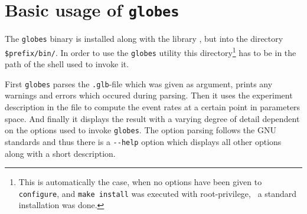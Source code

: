 \section{Basic usage of {\tt globes}}
\label{sec:globes_basics}

The {\tt globes} binary is installed along 
with the library , but
into the directory {\tt \$prefix/bin/}. In order to use the {\tt globes} 
utility this directory\footnote{This is automatically the case, when
no options have been given to {\tt configure}, and {\tt make install} was 
executed with root-privilege, \ie\ a standard installation was done.} has to 
be in the path of the shell used to invoke it.

First {\tt globes} parses the {\tt .glb}-file which was given as argument,
prints any warnings and errors which occured during parsing. Then it
uses the experiment description in the file to compute the event rates
at a certain point in parameters space. And finally it displays the result
with a varying degree of detail dependent on the options used to invoke
{\tt globes}. The option parsing follows the GNU standards and thus there
is a {\tt \verb+--+help} option which displays all other options 
along with a short description.

